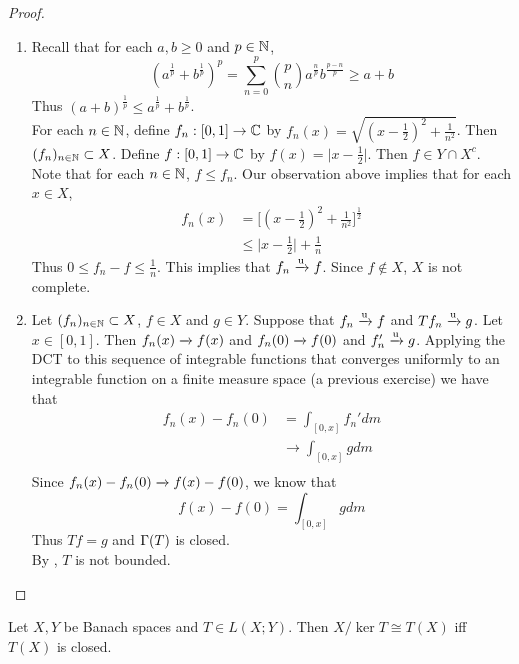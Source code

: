\documentclass{book}
\begin{document}
	\begin{proof}
		\begin{enumerate}
			\item Recall that for each $a,b \geq 0$ and $p \in \mathbb{N}$, $$(a^{\frac{1}{p}}+b^{\frac{1}{p}})^p = \sum_{n=0}^p  {p \choose n} a^{\frac{n}{p}}b^{\frac{p-n}{p}} \geq a + b$$ Thus $(a+b)^{\frac{1}{p}} \leq a^{\frac{1}{p}}+b^{\frac{1}{p}}$.\\
			For each $n \in \mathbb{N}$, define $f_n: [0,1] \rightarrow \mathbb{C}$ by $f_n(x) = \sqrt{(x-\frac{1}{2})^2+ \frac{1}{n^2}}$. Then $(f_n)_{n \in \mathbb{N}} \subset X$. Define $f:[0,1] \rightarrow \mathbb{C}$ by $f(x) = \vert x-\frac{1}{2}\vert$. Then $f \in Y \cap X^c$. Note that for each $n \in \mathbb{N}$, $f \leq f_n$. Our observation above implies that for each $x \in X$,
			\begin{align*}
				f_n(x) 
				&= \bigg[ (x-\frac{1}{2})^2 + \frac{1}{n^2} \bigg]^{\frac{1}{2}}\\
				& \leq \vert x-\frac{1}{2} \vert + \frac{1}{n}
			\end{align*}
			Thus $0 \leq f_n - f \leq \frac{1}{n} $. This implies that $f_n \xrightarrow{\text{u}} f$. Since $f \not \in X$, $X$ is not complete. \vspace{.5cm}\\
			\item Let $(f_n)_{n \in \mathbb{N}} \subset X$, $f \in X$ and $g \in Y$. Suppose that $f_n \xrightarrow{\text{u}} f$ and $Tf_n \xrightarrow{\text{u}} g$. Let $x \in [0,1]$. Then $f_n(x) \xrightarrow{} f(x)$ and $f_n(0) \xrightarrow{} f(0)$ and $f_n' \xrightarrow{\text{u}} g$. Applying the DCT to this sequence of integrable functions that converges uniformly to an integrable function on a finite measure space (a previous exercise) we have that
			\begin{align*}
				f_n(x) - f_n(0) 
				&= \int_{[0,x]} f_n' dm \\
				& \rightarrow \int_{[0,x]} g dm \\ 
			\end{align*} 
			Since $f_n(x) - f_n(0) \xrightarrow{} f(x) - f(0)$, we know that $$f(x) - f(0) = \int_{[0,x]} g dm$$ Thus $Tf = g$ and $\Gamma(T)$ is closed. \\
			By , $T$ is not bounded.
		\end{enumerate}
	\end{proof}
	
	\begin{ex} \lex{}
		Let $X, Y$ be Banach spaces and $T \in L(X; Y)$. Then $X/\ker T \cong T(X)$ iff $T(X)$ is closed.
	\end{ex}
	
\end{document}

